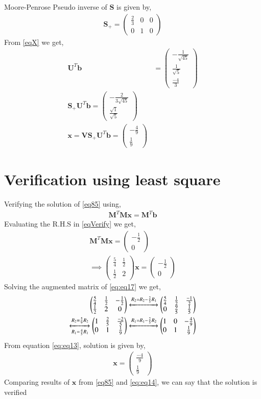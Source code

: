 \documentclass[journal,12pt,twocolumn]{IEEEtran}
\newcommand{\myvec}[1]{\ensuremath{\begin{pmatrix}#1\end{pmatrix}}}
\numberwithin{equation}{subsection}
\let\vec\mathbf
\begin{document}
Moore-Penrose Pseudo inverse of $\vec{S}$ is given by,
\begin{align}
\vec{S_+} = \myvec{\frac{2}{3}&0&0\\0&1&0}
\end{align}
From \eqref{eqX} we get,
\begin{align}
\vec{U}^T\vec{b}&=\myvec{-\frac{1}{\sqrt{45}}\\\frac{1}{\sqrt{5}}\\\frac{-4}{3}}\\
\vec{S_+}\vec{U}^T\vec{b}=\myvec{-\frac{2}{3\sqrt{45}}\\\frac{\sqrt{1}}{\sqrt{5}}}\\
\vec{x} = \vec{V}\vec{S_+}\vec{U}^T\vec{b} = \myvec{-\frac{4}{9}\\\frac{1}{9}}\label{eq85}
\end{align}
\section{Verification using least square}
Verifying the solution of \eqref{eq85} using,
\begin{align}
\vec{M}^T\vec{M}\vec{x} = \vec{M}^T\vec{b}\label{eqVerify}
\end{align}
Evaluating the R.H.S in \eqref{eqVerify} we get,
\begin{align}
\vec{M}^T\vec{M}\vec{x} = \myvec{-\frac{1}{2}\\0}\\
\implies\myvec{\frac{5}{4}&\frac{1}{2}\\\frac{1}{2}&2}\vec{x} = \myvec{-\frac{1}{2}\\0}\label{eq:eq17}
\end{align}
Solving the augmented matrix of \eqref{eq:eq17} we get,
\begin{align}
\myvec{\frac{5}{4}&\frac{1}{2}&-\frac{1}{2}\\\frac{1}{2}&2&0} &\xleftrightarrow{R_2=R_2-\frac{2}{5}R_1}\myvec{\frac{5}{4}&\frac{1}{2}&\frac{-1}{2}\\0&\frac{9}{5}&\frac{1}{5}}\\
\xleftrightarrow[R_1=\frac{4}{5}R_1]  {R_2=\frac{5}{9}R_2}\myvec{1&\frac{2}{5}&\frac{-2}{5}\\0&1&\frac{1}{9}}&\xleftrightarrow{R_1=R_1-\frac{2}{5}R_2}\myvec{1&0&-\frac{4}{9}\\0&1&\frac{1}{9}}\label{eq:eq13}
\end{align}
From equation \eqref{eq:eq13}, solution is given by,
\begin{align}\label{eq:eq14}
\vec{x}=\myvec{\frac{-4}{9}\\\frac{1}{9}}
\end{align}
Comparing results of $\vec{x}$ from \eqref{eq85} and \eqref{eq:eq14}, we can say that the solution is verified\\
\end{document}

